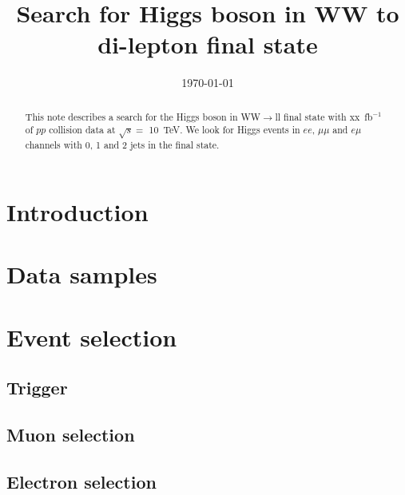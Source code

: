 \documentclass{cmspaper}
\begin{document}
\begin{titlepage}


  \date{\today}

  \title{Search for Higgs boson in WW to di-lepton final state}

  \begin{Authlist}
  \end{Authlist}


  \begin{abstract}
    This note describes a search for the Higgs boson in WW$\to$ll
    final state with xx~fb$^{-1}$ of $pp$ collision data at $\sqrt s =
    $ 10~TeV. We look for Higgs events in $ee$, $\mu\mu$ and $e\mu$
    channels with 0, 1 and 2 jets in the final state.
  \end{abstract} 

\end{titlepage}
\tableofcontents
\newpage 

\section{Introduction}
  \label{sec:overview}
%  
\section{Data samples}
  \label{sec:dataset}
%  
\section{Event selection}
  \label{sec:selection} 
%  
  \subsection{Trigger}
    \label{sec:sel_trigger}
%    
  \subsection{Muon selection} 
    \label{sec:sel_muons}
%    
  \subsection{Electron selection} 
    \label{sec:sel_electrons}
%    
\end{document}
